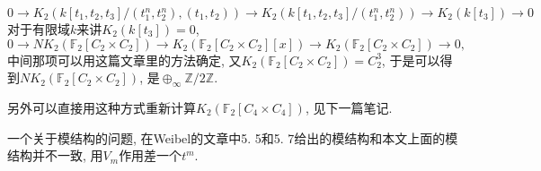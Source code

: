 \[
	0\longrightarrow K_2(k[t_1, t_2, t_3]/(t_1^n, t_2^n), (t_1, t_2)) \longrightarrow K_2(k[t_1, t_2, t_3]/(t_1^n, t_2^n)) \longrightarrow K_2(k[t_3]) \longrightarrow 0
	\]
对于有限域$k$来讲$K_2(k[t_3])=0$, 
\[0\longrightarrow NK_2(\mathbb{F}_2[C_{2}\times C_2]) \longrightarrow K_2(\mathbb{F}_2[C_{2}\times C_2][x])\longrightarrow K_2(\mathbb{F}_2[C_{2}\times C_2]) \longrightarrow 0, \]
中间那项可以用这篇文章里的方法确定, 又$K_2(\mathbb{F}_2[C_{2}\times C_2])=C_2^3$, 于是可以得到$NK_2(\mathbb{F}_2[C_{2}\times C_2])$, 是$\oplus_{\infty} \mathbb{Z}/2 \mathbb{Z}$. 

另外可以直接用这种方式重新计算$K_2(\mathbb{F}_2[C_4\times C_4])$, 见下一篇笔记. 


一个关于模结构的问题, 在Weibel的文章\cite{MR88f:18018}中5. 5和5. 7给出的模结构和本文上面的模结构并不一致, 用$V_m$作用差一个$t^m$. 
